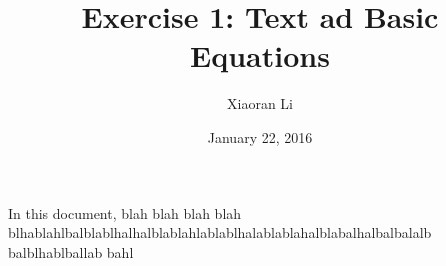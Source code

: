 \documentclass{article}
\title{Exercise 1: Text ad Basic Equations}
\author{Xiaoran Li}
\date{January 22, 2016}
\begin{document}
	\maketitle
	
	In this document, blah blah blah blah blhablahlbalblablhalhalblablahlablablhalablablahalblabalhalbalbalalb balblhablballab bahl
	
	
\end{document}
